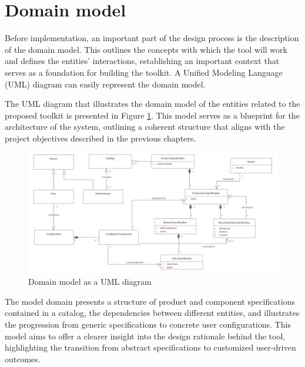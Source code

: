 \section{Domain model} \label{domain-model}

Before implementation, an important part of the design process is the description of the domain model. This outlines the concepts with which the tool will work and defines the entities' interactions, establishing an important context that serves as a foundation for building the toolkit. A Unified Modeling Language (UML) diagram can easily represent the domain model. \cite{Wlaschin2018}

The UML diagram that illustrates the domain model of the entities related to the proposed toolkit is presented in Figure \ref{fig:domain-model}. This model serves as a blueprint for the architecture of the system, outlining a coherent structure that aligns with the project objectives described in the previous chapters. 

\begin{landscape}
\begin{figure}[h]
\centering
\includegraphics[width=\linewidth]{images/uml_domainmodel.png}
\caption{Domain model as a UML diagram}
\label{fig:domain-model}
\end{figure}
\end{landscape}

The model domain presents a structure of product and component specifications contained in a catalog, the dependencies between different entities, and illustrates the progression from generic specifications to concrete user configurations. This model aims to offer a clearer insight into the design rationale behind the tool, highlighting the transition from abstract specifications to customized user-driven outcomes.


